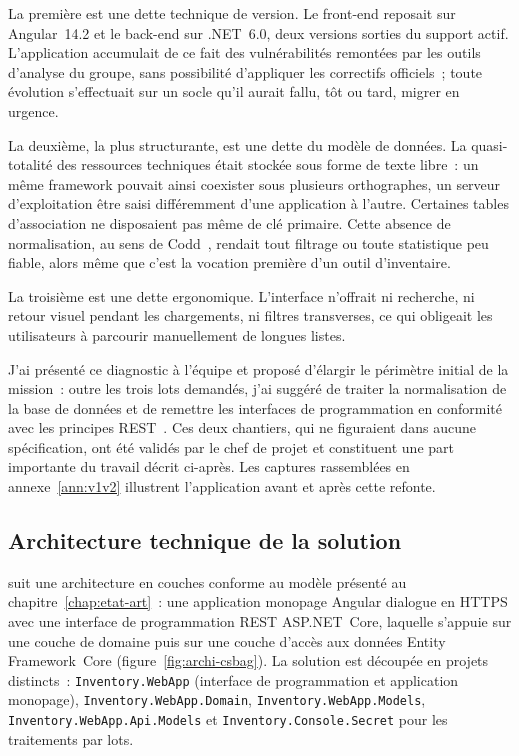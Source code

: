 La première est une dette technique de version. Le front-end reposait sur
Angular~14.2 et le back-end sur .NET~6.0, deux versions sorties du support
actif. L'application accumulait de ce fait des vulnérabilités remontées par les
outils d'analyse du groupe, sans possibilité d'appliquer les correctifs
officiels~; toute évolution s'effectuait sur un socle qu'il aurait fallu, tôt ou
tard, migrer en urgence.

La deuxième, la plus structurante, est une dette du modèle de données.
La quasi-totalité des ressources techniques était stockée sous forme de texte
libre~: un même framework pouvait ainsi coexister sous plusieurs orthographes,
un serveur d'exploitation être saisi différemment d'une application à l'autre.
Certaines tables d'association ne disposaient pas même de clé primaire. Cette
absence de normalisation, au sens de Codd~\cite{codd1972normalization}, rendait
tout filtrage ou toute statistique peu fiable, alors même que c'est la vocation
première d'un outil d'inventaire.

La troisième est une dette ergonomique. L'interface n'offrait ni
recherche, ni retour visuel pendant les chargements, ni filtres transverses, ce
qui obligeait les utilisateurs à parcourir manuellement de longues listes.

J'ai présenté ce diagnostic à l'équipe et proposé d'élargir le périmètre initial
de la mission~: outre les trois lots demandés, j'ai suggéré de traiter la
normalisation de la base de données et de remettre les interfaces de
programmation en conformité avec les principes REST~\cite{fielding2000rest}.
Ces deux chantiers, qui ne figuraient dans aucune spécification, ont été
validés par le chef de projet et constituent une part importante du travail
décrit ci-après. Les captures rassemblées en annexe~\ref{ann:v1v2} illustrent
l'application avant et après cette refonte.

\subsection{Architecture technique de la solution}
\label{sec:archi-csbag}

\csbag suit une architecture en couches conforme au modèle présenté au
chapitre~\ref{chap:etat-art}~: une application monopage Angular dialogue en
HTTPS avec une interface de programmation REST ASP.NET~Core, laquelle s'appuie
sur une couche de domaine puis sur une couche d'accès aux données Entity
Framework~Core (figure~\ref{fig:archi-csbag}). La solution est découpée en
projets distincts~: \texttt{Inventory.WebApp} (interface de programmation et
application monopage), \texttt{Inventory.WebApp.Domain},
\texttt{Inventory.WebApp.Models}, \texttt{Inventory.WebApp.Api.Models} et
\texttt{Inventory.Console.Secret} pour les traitements par lots.

